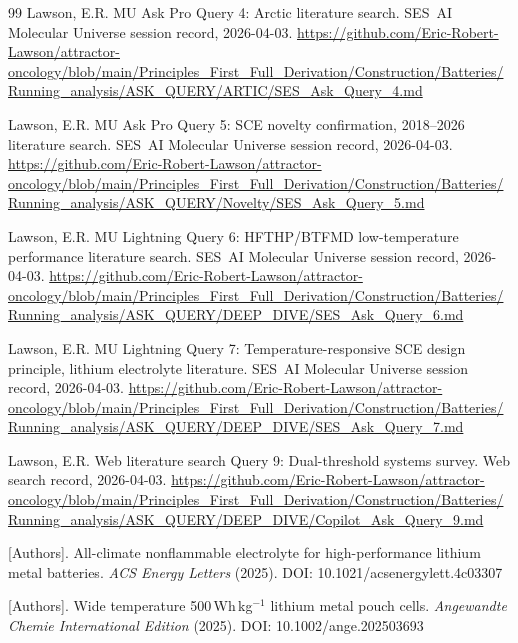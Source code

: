 \documentclass[12pt,letterpaper]{article}
\begin{document}
\begin{thebibliography}{99}
Lawson, E.R.
MU Ask Pro Query 4: Arctic literature search.
SES~AI Molecular Universe session record,
2026-04-03.
\url{https://github.com/Eric-Robert-Lawson/attractor-oncology/blob/main/Principles_First_Full_Derivation/Construction/Batteries/Running_analysis/ASK_QUERY/ARTIC/SES_Ask_Query_4.md}

Lawson, E.R.
MU Ask Pro Query 5: SCE novelty confirmation,
2018--2026 literature search.
SES~AI Molecular Universe session record,
2026-04-03.
\url{https://github.com/Eric-Robert-Lawson/attractor-oncology/blob/main/Principles_First_Full_Derivation/Construction/Batteries/Running_analysis/ASK_QUERY/Novelty/SES_Ask_Query_5.md}

Lawson, E.R.
MU Lightning Query 6: HFTHP/BTFMD low-temperature
performance literature search.
SES~AI Molecular Universe session record,
2026-04-03.
\url{https://github.com/Eric-Robert-Lawson/attractor-oncology/blob/main/Principles_First_Full_Derivation/Construction/Batteries/Running_analysis/ASK_QUERY/DEEP_DIVE/SES_Ask_Query_6.md}

Lawson, E.R.
MU Lightning Query 7: Temperature-responsive SCE
design principle, lithium electrolyte literature.
SES~AI Molecular Universe session record,
2026-04-03.
\url{https://github.com/Eric-Robert-Lawson/attractor-oncology/blob/main/Principles_First_Full_Derivation/Construction/Batteries/Running_analysis/ASK_QUERY/DEEP_DIVE/SES_Ask_Query_7.md}

Lawson, E.R.
Web literature search Query 9: Dual-threshold systems
survey.
Web search record, 2026-04-03.
\url{https://github.com/Eric-Robert-Lawson/attractor-oncology/blob/main/Principles_First_Full_Derivation/Construction/Batteries/Running_analysis/ASK_QUERY/DEEP_DIVE/Copilot_Ask_Query_9.md}

[Authors].
All-climate nonflammable electrolyte for high-performance
lithium metal batteries.
\textit{ACS Energy Letters} (2025).
DOI: 10.1021/acsenergylett.4c03307

[Authors].
Wide temperature 500\,Wh\,kg$^{-1}$ lithium metal
pouch cells.
\textit{Angewandte Chemie International Edition}
(2025).
DOI: 10.1002/ange.202503693

\end{thebibliography}

\appendix
\end{document}
